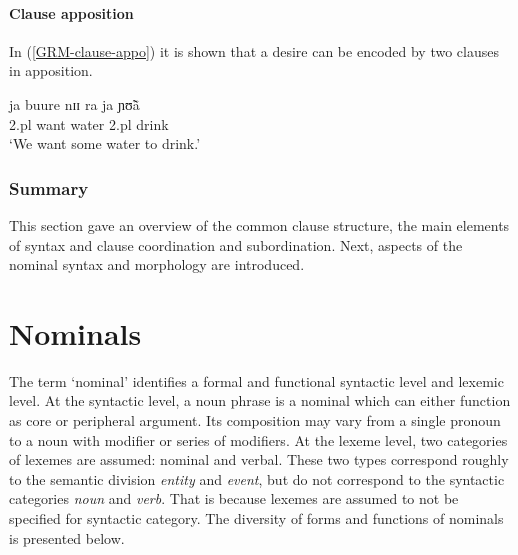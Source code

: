  \paragraph{Clause apposition}
 \label{GRM-dep-comp-clause}
% 
In (\ref{GRM-clause-appo}) it is shown that a desire can be
encoded by two clauses in apposition. 
% 
 \begin{exe}
 \ex\label{GRM-clause-appo}
 \gll ja buure nɪɪ ra ja ɲʊ̃ã\\
{\sc 2.pl} want water {\foc} {\sc 2.pl} drink\\
 \glt  `We want some water to drink.' 
 \end{exe}



\subsubsection{Summary}
\label{GRM-clause-summary}

This section gave an overview of the  common clause structure, the main
elements of syntax and clause coordination and subordination. Next, aspects of
the nominal syntax and morphology are
introduced.


% 




\section{Nominals}
\label{sec:GRM-nom}


The term `nominal'  identifies  a formal and functional  syntactic level and
lexemic level. At the syntactic level, a noun phrase is a nominal  which can
either function as core or peripheral argument.  Its composition may
vary from a single pronoun to a noun with modifier or series of
modifiers. At the lexeme level, two categories of lexemes are assumed:
nominal and verbal. These two types correspond roughly to the semantic division
{\it entity} and {\it event}, but do not correspond to the syntactic categories
{\it noun} and {\it verb}. That is because lexemes are assumed to not be
specified for syntactic category. The diversity  of forms and functions of
nominals is presented below. 


